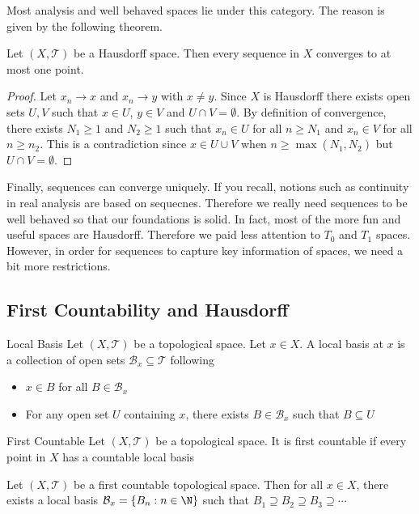 Most analysis and well behaved spaces lie under this category. The reason is given by the following theorem. 

\begin{thm}{}{} Let $(X,\mathcal{T})$ be a Hausdorff space. Then every sequence in $X$ converges to at most one point. \tcbline
\begin{proof}
Let $x_n\to x$ and $x_n\to y$ with $x\neq y$. Since $X$ is Hausdorff there exists open sets $U,V$ such that $x\in U$, $y\in V$ and $U\cap V=\emptyset$. By definition of convergence, there exists $N_1\geq 1$ and $N_2\geq 1$ such that $x_n\in U$ for all $n\geq N_1$ and $x_n\in V$ for all $n\geq n_2$. This is a contradiction since $x\in U\cup V$ when $n\geq \max(N_1,N_2)$ but $U\cap V=\emptyset$. 
\end{proof}
\end{thm}

Finally, sequences can converge uniquely. If you recall, notions such as continuity in real analysis are based on sequecnes. Therefore we really need sequences to be well behaved so that our foundations is solid. In fact, most of the more fun and useful spaces are Hausdorff. Therefore we paid less attention to $T_0$ and $T_1$ spaces. However, in order for sequences to capture key information of spaces, we need a bit more restrictions. 

\subsection{First Countability and Hausdorff}
\begin{defn}{Local Basis}{} Let $(X,\mathcal{T})$ be a topological space. Let $x\in X$. A local basis at $x$ is a collection of open sets $\mathcal{B}_x\subseteq\mathcal{T}$ following
\begin{itemize}
\item $x\in B$ for all $B\in\mathcal{B}_x$
\item For any open set $U$ containing $x$, there exists $B\in\mathcal{B}_x$ such that $B\subseteq U$
\end{itemize}
\end{defn}

\begin{defn}{First Countable}{} Let $(X,\mathcal{T})$ be a topological space. It is first countable if every point in $X$ has a countable local basis
\end{defn}

\begin{prp}{}{} Let $(X,\mathcal{T})$ be a first countable topological space. Then for all $x\in X$, there exists a local basis $\mathcal{B}_x=\{B_n:n\in\N\}$ such that $B_1\supseteq B_2\supseteq B_3\supseteq\cdots$
\end{prp}

